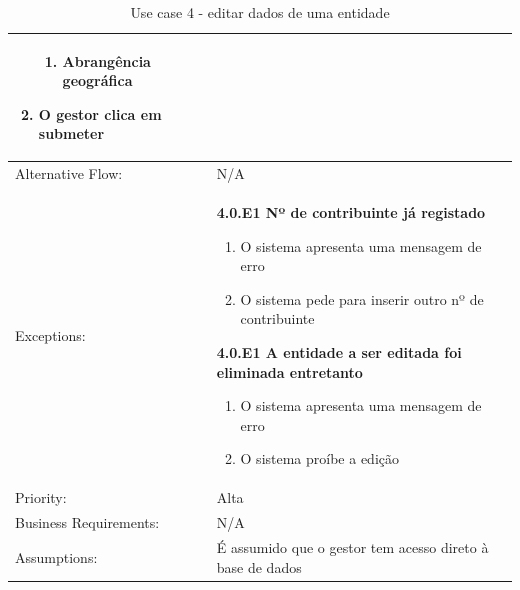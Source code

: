 \documentclass{scrreprt}
\begin{document}
\begin{table}[H]
\begin{adjustbox}{width=1.1\textwidth,center=\textwidth}
\begin{tabular}{|m{4cm}|m{12cm}|}
\begin{enumerate}
\begin{enumerate}
                    \item Abrangência geográfica
                \end{enumerate}
                \item O gestor clica em submeter
            \end{enumerate} \\
            \hline
            Alternative Flow: & N/A \\
            \hline
            Exceptions: & \textbf{4.0.E1  Nº de contribuinte já registado}
            \begin{enumerate}
                \item O sistema apresenta uma mensagem de erro
                \item O sistema pede para inserir outro nº de contribuinte
            \end{enumerate}
            \textbf{4.0.E1  A entidade a ser editada foi eliminada entretanto}
            \begin{enumerate}
                \item O sistema apresenta uma mensagem de erro
                \item O sistema proíbe a edição
            \end{enumerate} \\
            \hline
            Priority: & Alta \\
            \hline
            Business Requirements: & N/A \\
            \hline
            Assumptions: & É assumido que o gestor tem acesso direto à base de dados \\
            \hline
        \end{tabular}
    \end{adjustbox}
    \caption{Use case 4 - editar dados de uma entidade}
    \label{use case 4}
\end{table}
\end{document}
